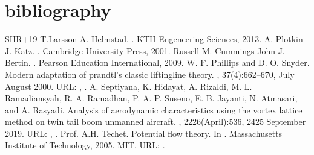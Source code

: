 \documentclass[letterpaper,10pt,english]{jupyterBook}
\begin{document}
\chapter{bibliography}
\label{\detokenize{chapters/bibliography:bibliography}}\label{\detokenize{chapters/bibliography::doc}}
\begin{sphinxthebibliography}{SHR+19}
\sphinxAtStartPar
T.Larsson A. Helmstad. . KTH Engeneering Sciences, 2013.
\sphinxAtStartPar
A. Plotkin J. Katz. . Cambridge University Press, 2001.
\sphinxAtStartPar
Russell M. Cummings John J. Bertin. . Pearson Education International, 2009.
\sphinxAtStartPar
W. F. Phillips and D. O. Snyder. Modern adaptation of prandtl's classic lifting\sphinxhyphen{}line theory. , 37(4):662–670, July \sphinxhyphen{} August 2000. URL: , .
\sphinxAtStartPar
A. Septiyana, K. Hidayat, A. Rizaldi, M. L. Ramadiansyah, R. A. Ramadhan, P. A. P. Suseno, E. B. Jayanti, N. Atmasari, and A. Rasyadi. Analysis of aerodynamic characteristics using the vortex lattice method on twin tail boom unmanned aircraft. , 2226(April):536, 24\sphinxhyphen{}25 September 2019. URL: , .
\sphinxAtStartPar
Prof. A.H. Techet. Potential flow theory. In . Massachusetts Institute of Technology, 2005. MIT. URL: .
\end{sphinxthebibliography}







\renewcommand{\indexname}{Index}
\printindex
\end{document}
